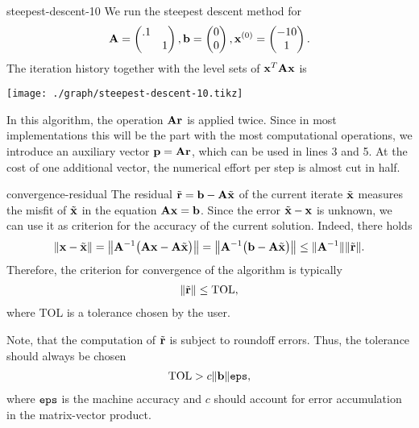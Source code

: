 \begin{Example}{steepest-descent-10}
  We run the steepest descent method for
  \begin{gather}
    \mata =
    \begin{pmatrix}
      .1 \\&1
    \end{pmatrix},
    \vb =
    \begin{pmatrix}
      0\\0
    \end{pmatrix},
    \vx^{(0)} =
    \begin{pmatrix}
      -10\\1
    \end{pmatrix}.
  \end{gather}
  The iteration history together with  the level sets of $\vx^T\mata\vx$ is
  \begin{center}
    \texttt{[image: ./graph/steepest-descent-10.tikz]}
  \end{center}
\end{Example}

\begin{remark}
  In this algorithm, the operation $\mata\vr$ is applied twice. Since
  in most implementations this will be the part with the most
  computational operations, we introduce an auxiliary vector
  $\vp = \mata\vr$, which can be used in lines 3 and 5. At the cost of
  one additional vector, the numerical effort per step is almost
  cut in half.
\end{remark}

\begin{Remark}{convergence-residual}
  The residual $\tilde \vr = \vb - \mata\tilde\vx$ of the current iterate
  $\tilde\vx$ measures the misfit of $\tilde\vx$ in the equation
  $\mata\vx = \vb$. Since the error $\tilde\vx-\vx$ is unknown, we can
  use it as criterion for the accuracy of the current
  solution. Indeed, there holds
  \begin{gather}
    \norm{\vx-\tilde\vx}
    = \norm*{\mata^{-1}\bigl(\mata\vx - \mata\tilde\vx\bigr)}
    = \norm*{\mata^{-1}\bigl(\vb - \mata\tilde\vx\bigr)}
    \le \norm{\mata^{-1}}\norm{\tilde \vr}.
  \end{gather}
  Therefore, the criterion for convergence of the algorithm is typically
  \begin{gather}
    \norm{\tilde \vr} \le \text{TOL},
  \end{gather}
  where TOL is a tolerance chosen by the user.

  Note, that the computation of $\tilde \vr$ is subject to roundoff
  errors. Thus, the tolerance should always be chosen
  \begin{gather}
    \text{TOL} > c\norm{\vb}\eps,
  \end{gather}
  where $\eps$ is the machine accuracy and $c$ should account for
  error accumulation in the matrix-vector product.
\end{Remark}

